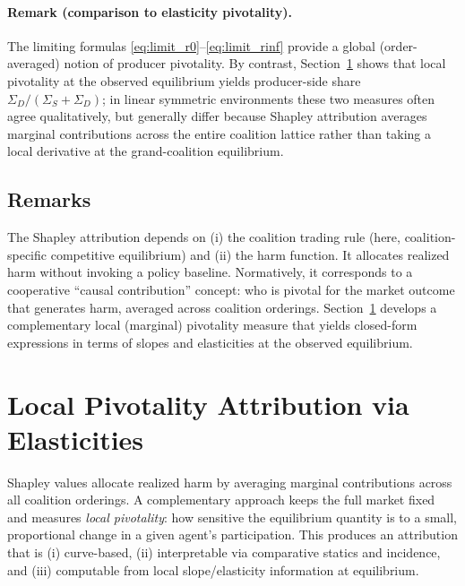 \documentclass[journal, a4paper]{IEEEtran}
\begin{document}
\paragraph{Remark (comparison to elasticity pivotality).}
The limiting formulas \eqref{eq:limit_r0}--\eqref{eq:limit_rinf} provide a global (order-averaged) notion of producer pivotality. By contrast, Section~\ref{sec:elasticity} shows that local pivotality at the observed equilibrium yields producer-side share $\Sigma_D/(\Sigma_S+\Sigma_D)$; in linear symmetric environments these two measures often agree qualitatively, but generally differ because Shapley attribution averages marginal contributions across the entire coalition lattice rather than taking a local derivative at the grand-coalition equilibrium.


\subsection{Remarks}
The Shapley attribution depends on (i) the coalition trading rule (here, coalition-specific competitive equilibrium) and (ii) the harm function. It allocates realized harm without invoking a policy baseline. Normatively, it corresponds to a cooperative ``causal contribution'' concept: who is pivotal for the market outcome that generates harm, averaged across coalition orderings. Section~\ref{sec:elasticity} develops a complementary local (marginal) pivotality measure that yields closed-form expressions in terms of slopes and elasticities at the observed equilibrium.

\section{Local Pivotality Attribution via Elasticities}
\label{sec:elasticity}
Shapley values allocate realized harm by averaging marginal contributions across all coalition orderings. A complementary approach keeps the full market fixed and measures \emph{local pivotality}: how sensitive the equilibrium quantity is to a small, proportional change in a given agent's participation. This produces an attribution that is (i) curve-based, (ii) interpretable via comparative statics and incidence, and (iii) computable from local slope/elasticity information at equilibrium.
\end{document}
